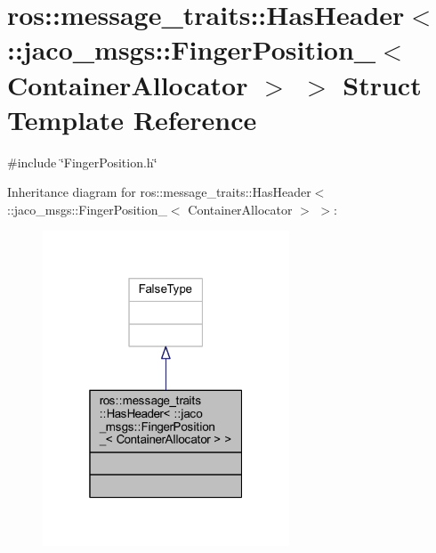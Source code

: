 \hypertarget{structros_1_1message__traits_1_1HasHeader_3_01_1_1jaco__msgs_1_1FingerPosition___3_01ContainerAllocator_01_4_01_4}{}\section{ros\+:\+:message\+\_\+traits\+:\+:Has\+Header$<$ \+:\+:jaco\+\_\+msgs\+:\+:Finger\+Position\+\_\+$<$ Container\+Allocator $>$ $>$ Struct Template Reference}
\label{structros_1_1message__traits_1_1HasHeader_3_01_1_1jaco__msgs_1_1FingerPosition___3_01ContainerAllocator_01_4_01_4}


{\ttfamily \#include \char`\"{}Finger\+Position.\+h\char`\"{}}



Inheritance diagram for ros\+:\+:message\+\_\+traits\+:\+:Has\+Header$<$ \+:\+:jaco\+\_\+msgs\+:\+:Finger\+Position\+\_\+$<$ Container\+Allocator $>$ $>$\+:
\nopagebreak
\begin{figure}[H]
\begin{center}
\leavevmode
\includegraphics[width=208pt]{d5/d80/structros_1_1message__traits_1_1HasHeader_3_01_1_1jaco__msgs_1_1FingerPosition___3_01ContainerAl4f0c8055c18693a7d38b4506797be4bb}
\end{center}
\end{figure}


